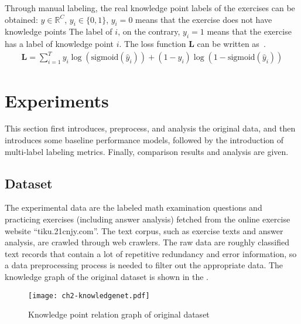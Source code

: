Through manual labeling, the real knowledge point labels of the exercises can be obtained: \(y\in \mathbb{R}^C\), \(y_i\in \{0,1\} \), \(y_i=0\) means that the exercise does not have knowledge points The label of \(i\), on the contrary, \(y_i=1\) means that the exercise has a label of knowledge point \(i\). The loss function \(\mathbf{L}\) can be written as~\eqname{\ref{fml:ch2-lossfunction}}.
\begin{align}\label{fml:ch2-lossfunction}
    \mathbf{L}=\sum_{i=1}^{T} y_i \log (\text{sigmoid}(\hat{y}_i))+(1-y_i) \log (1-\text{sigmoid}(\hat{y}_i))
\end{align}

\section{Experiments}
This section first introduces, preprocess, and analysis the original data, and then introduces some baseline performance models, followed by the introduction of multi-label labeling metrics. Finally, comparison results and analysis are given.
\subsection{Dataset}
The experimental data are the labeled math examination questions and practicing exercises (including answer analysis) fetched from the online exercise website ``tiku.21cnjy.com''. The text corpus, such as exercise texts and answer analysis, are crawled through web crawlers. The raw data are roughly classified text records that contain a lot of repetitive redundancy and error information, so a data preprocessing process is needed to filter out the appropriate data. The knowledge graph of the original dataset is shown in the \figname{\ref{fig:ch2-model-knowledgenet}}.
\begin{figure}[htbp!]
    \centering
    \texttt{[image: ch2-knowledgenet.pdf]}
    \caption{Knowledge point relation graph of original dataset}\label{fig:ch2-model-knowledgenet}
\end{figure}

